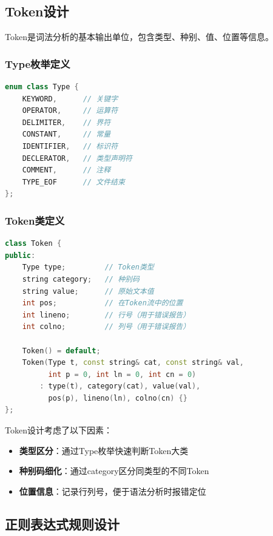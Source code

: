 \documentclass[12pt,a4paper]{ctexart}
\begin{document}
\subsection{Token设计}

Token是词法分析的基本输出单位，包含类型、种别、值、位置等信息。

\subsubsection{Type枚举定义}

\begin{lstlisting}[language=C++, caption={Type枚举定义（Type.h）}]
enum class Type {
    KEYWORD,      // 关键字
    OPERATOR,     // 运算符
    DELIMITER,    // 界符
    CONSTANT,     // 常量
    IDENTIFIER,   // 标识符
    DECLERATOR,   // 类型声明符
    COMMENT,      // 注释
    TYPE_EOF      // 文件结束
};
\end{lstlisting}

\subsubsection{Token类定义}

\begin{lstlisting}[language=C++, caption={Token类定义（Token.h）}]
class Token {
public:
    Type type;         // Token类型
    string category;   // 种别码
    string value;      // 原始文本值
    int pos;           // 在Token流中的位置
    int lineno;        // 行号（用于错误报告）
    int colno;         // 列号（用于错误报告）

    Token() = default;
    Token(Type t, const string& cat, const string& val,
          int p = 0, int ln = 0, int cn = 0)
        : type(t), category(cat), value(val),
          pos(p), lineno(ln), colno(cn) {}
};
\end{lstlisting}

Token设计考虑了以下因素：
\begin{itemize}
    \item \textbf{类型区分}：通过Type枚举快速判断Token大类
    \item \textbf{种别码细化}：通过category区分同类型的不同Token
    \item \textbf{位置信息}：记录行列号，便于语法分析时报错定位
\end{itemize}

\subsection{正则表达式规则设计}
\end{document}

